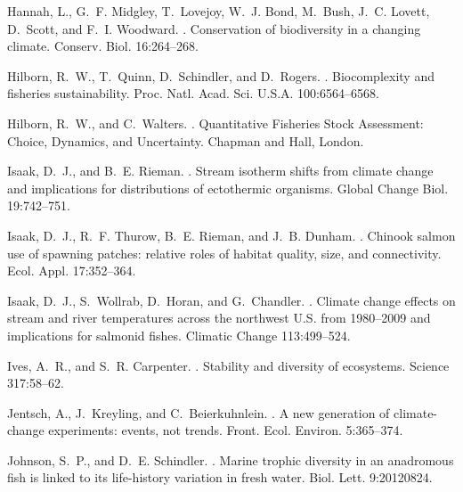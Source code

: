 \documentclass[12pt,english]{article}
\begin{document}
\begin{spacing}{1.9}
\begin{thebibliography}{64}
Hannah, L., G.~F. Midgley, T.~Lovejoy, W.~J. Bond, M.~Bush, J.~C. Lovett,
  D.~Scott, and F.~I. Woodward.
.
\newblock Conservation of biodiversity in a changing climate.
\newblock Conserv. Biol. 16:264--268.

Hilborn, R.~W., T.~Quinn, D.~Schindler, and D.~Rogers.
.
\newblock Biocomplexity and fisheries sustainability.
\newblock Proc. Natl. Acad. Sci. U.S.A. 100:6564--6568.

Hilborn, R.~W., and C.~Walters.
.
\newblock Quantitative Fisheries Stock Assessment: Choice, Dynamics, and
  Uncertainty.
\newblock Chapman and Hall, London.

Isaak, D.~J., and B.~E. Rieman.
.
\newblock Stream isotherm shifts from climate change and implications for
  distributions of ectothermic organisms.
\newblock Global Change Biol. 19:742--751.

Isaak, D.~J., R.~F. Thurow, B.~E. Rieman, and J.~B. Dunham.
.
\newblock Chinook salmon use of spawning patches: relative roles of habitat
  quality, size, and connectivity.
\newblock Ecol. Appl. 17:352--364.

Isaak, D.~J., S.~Wollrab, D.~Horan, and G.~Chandler.
.
\newblock Climate change effects on stream and river temperatures across the
  northwest U.S. from 1980--2009 and implications for salmonid fishes.
\newblock Climatic Change 113:499--524.

Ives, A.~R., and S.~R. Carpenter.
.
\newblock Stability and diversity of ecosystems.
\newblock Science 317:58--62.

Jentsch, A., J.~Kreyling, and C.~Beierkuhnlein.
.
\newblock A new generation of climate-change experiments: events, not trends.
\newblock Front. Ecol. Environ. 5:365--374.

Johnson, S.~P., and D.~E. Schindler.
.
\newblock Marine trophic diversity in an anadromous fish is linked to its
  life-history variation in fresh water.
\newblock Biol. Lett. 9:20120824.


\end{thebibliography}
\end{spacing}
\end{document}
